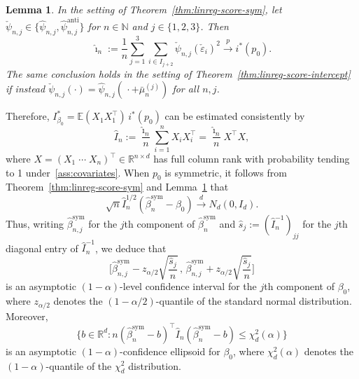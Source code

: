 \documentclass[a4paper]{article}
\newcommand{\N}{\mathbb{N}}
\newcommand{\R}{\mathbb{R}}
\newcommand{\E}{\mathbb{E}}
\newcommand{\cvp}{\overset{p}{\to}}
\newcommand{\cvd}{\overset{d}{\to}}
\newtheorem{lemma}[theorem]{Lemma}
\theoremstyle{definition}
\begin{document}
\begin{lemma}
\label{lem:observed-information}
In the setting of Theorem~\ref{thm:linreg-score-sym}, let $\check{\psi}_{n,j} \in \{\hat{\psi}_{n,j},\hat{\psi}_{n,j}^{\mathrm{anti}}\}$ for $n \in \N$ and $j \in \{1,2,3\}$. Then
\[
\hat{\imath}_n := \frac{1}{n}\sum_{j=1}^3 \sum_{i \in I_{j+2}}\check{\psi}_{n,j}(\check{\varepsilon}_i)^2 \cvp i^*(p_0).
\]
The same conclusion holds in the setting of Theorem~\ref{thm:linreg-score-intercept} if instead $\check{\psi}_{n,j}(\cdot) = \hat{\psi}_{n,j}(\,\cdot + \bar{\mu}_n^{(j)})$ for all $n,j$.
\end{lemma}

Therefore, $I_{\beta_0}^* = \E(X_1 X_1^\top)\,i^*(p_0)$ can be estimated consistently by 
\[
\hat{I}_n := \frac{\hat{\imath}_n}{n}\sum_{i=1}^n X_i X_i^\top = \frac{\hat{\imath}_n}{n}X^\top X,
\]
where $X = (X_1 \; \cdots \; X_n)^\top \in \mathbb{R}^{n \times d}$ has full column rank with probability tending to 1 under~\ref{ass:covariates}. When $p_0$ is symmetric, it follows from Theorem~\ref{thm:linreg-score-sym} and Lemma~\ref{lem:observed-information} that
\[
\sqrt{n}\hat{I}_n^{1/2}(\hat{\beta}_n^{\mathrm{sym}} - \beta_0) \cvd N_d(0, I_d).
\]
Thus, writing $\hat{\beta}_{n,j}^{\mathrm{sym}}$ for the $j$th component of $\hat{\beta}_n^{\mathrm{sym}}$ and $\hat{s}_j := (\hat{I}_n^{-1})_{jj}$ for the $j$th diagonal entry of $\hat{I}_n^{-1}$, we deduce that
\[
\biggl[\hat{\beta}_{n,j}^{\mathrm{sym}} - z_{\alpha/2}\sqrt{\frac{\hat{s}_j}{n}} \, , \, \hat{\beta}_{n,j}^{\mathrm{sym}} + z_{\alpha/2}\sqrt{\frac{\hat{s}_j}{n}}\biggl]
\]
is an asymptotic $(1-\alpha)$-level confidence interval for the $j$th component of $\beta_0$, where $z_{\alpha/2}$ denotes the $(1 - \alpha/2)$-quantile of the standard normal distribution. Moreover,
\[
\bigl\{b \in \R^d : n(\hat{\beta}_n^{\mathrm{sym}} - b)^\top\hat{I}_n(\hat{\beta}_n^{\mathrm{sym}} - b) \leq \chi_d^2(\alpha)\bigr\}
\]
is an asymptotic $(1 - \alpha)$-confidence ellipsoid for $\beta_0$, where $\chi_d^2(\alpha)$ denotes the $(1-\alpha)$-quantile of the $\chi_d^2$ distribution. 
\end{document}
